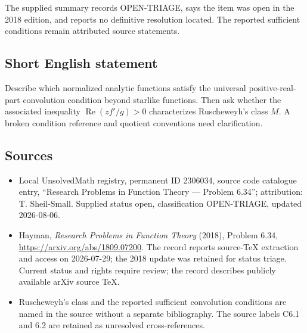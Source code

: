 \documentclass[11pt]{article}
\begin{document}
The supplied summary records OPEN-TRIAGE, says the item was open in the 2018 edition, and reports no definitive resolution located. The reported sufficient conditions remain attributed source statements.
\subsection{Short English statement}
Describe which normalized analytic functions satisfy the universal positive-real-part convolution condition beyond starlike functions. Then ask whether the associated inequality $\operatorname{Re}(zf'/g)>0$ characterizes Ruscheweyh's class $M$. A broken condition reference and quotient conventions need clarification.
\subsection{Sources}
\begin{itemize}
\item Local UnsolvedMath registry, permanent ID 2306034, source code catalogue entry, ``Research Problems in Function Theory --- Problem 6.34''; attribution: T. Sheil-Small. Supplied status open, classification OPEN-TRIAGE, updated 2026-08-06.
\item Hayman, \emph{Research Problems in Function Theory} (2018), Problem 6.34, \url{https://arxiv.org/abs/1809.07200}. The record reports source-TeX extraction and access on 2026-07-29; the 2018 update was retained for status triage. Current status and rights require review; the record describes publicly available arXiv source TeX.
\item Ruscheweyh's class and the reported sufficient convolution conditions are named in the source without a separate bibliography. The source labels C6.1 and 6.2 are retained as unresolved cross-references.
\end{itemize}
\end{document}
